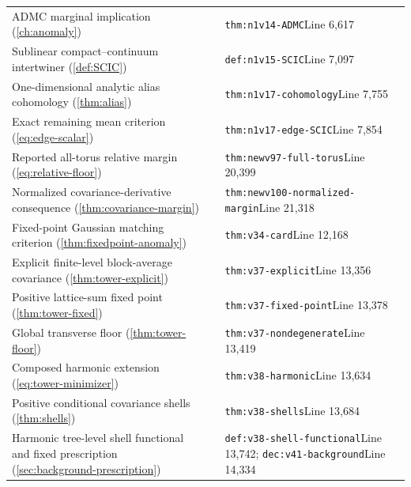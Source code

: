 \documentclass[11pt,oneside,openany]{book}
\theoremstyle{definition}
\theoremstyle{remark}
\begin{document}
\begin{longtable}{L{0.32\textwidth}L{0.12\textwidth}L{0.477\textwidth}}
ADMC marginal implication (\cref{ch:anomaly}) & \cite{F9} & \nolinkurl{thm:n1v14-ADMC}\newline Line 6,617 \\
Sublinear compact--continuum intertwiner (\cref{def:SCIC}) & \cite{F9} & \nolinkurl{def:n1v15-SCIC}\newline Line 7,097 \\
One-dimensional analytic alias cohomology (\cref{thm:alias}) & \cite{F9} & \nolinkurl{thm:n1v17-cohomology}\newline Line 7,755 \\
Exact remaining mean criterion (\cref{eq:edge-scalar}) & \cite{F9} & \nolinkurl{thm:n1v17-edge-SCIC}\newline Line 7,854 \\
Reported all-torus relative margin (\cref{eq:relative-floor}) & \cite{F10} & \nolinkurl{thm:newv97-full-torus}\newline Line 20,399 \\
Normalized covariance-derivative consequence (\cref{thm:covariance-margin}) & \cite{F10} & \nolinkurl{thm:newv100-normalized-margin}\newline Line 21,318 \\
Fixed-point Gaussian matching criterion (\cref{thm:fixedpoint-anomaly}) & \cite{F11} & \nolinkurl{thm:v34-card}\newline Line 12,168 \\
Explicit finite-level block-average covariance (\cref{thm:tower-explicit}) & \cite{F11} & \nolinkurl{thm:v37-explicit}\newline Line 13,356 \\
Positive lattice-sum fixed point (\cref{thm:tower-fixed}) & \cite{F11} & \nolinkurl{thm:v37-fixed-point}\newline Line 13,378 \\
Global transverse floor (\cref{thm:tower-floor}) & \cite{F11} & \nolinkurl{thm:v37-nondegenerate}\newline Line 13,419 \\
Composed harmonic extension (\cref{eq:tower-minimizer}) & \cite{F11} & \nolinkurl{thm:v38-harmonic}\newline Line 13,634 \\
Positive conditional covariance shells (\cref{thm:shells}) & \cite{F11} & \nolinkurl{thm:v38-shells}\newline Line 13,684 \\
Harmonic tree-level shell functional and fixed prescription (\cref{sec:background-prescription}) & \cite{F11} & \nolinkurl{def:v38-shell-functional}\newline Line 13,742; \nolinkurl{dec:v41-background}\newline Line 14,334 \\

\end{longtable}
\end{document}
